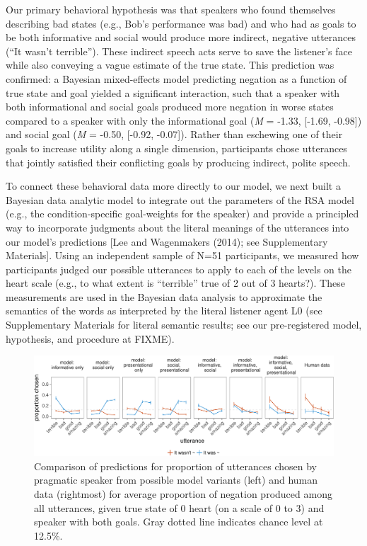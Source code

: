 \documentclass[floatsintext,man]{apa6}
\theoremstyle{definition}
\theoremstyle{definition}
\theoremstyle{definition}
\theoremstyle{remark}
\begin{document}
Our primary behavioral hypothesis was that speakers who found themselves
describing bad states (e.g., Bob's performance was bad) and who had as
goals to be both informative and social would produce more indirect,
negative utterances (\enquote{It wasn't terrible}). These indirect
speech acts serve to save the listener's face while also conveying a
vague estimate of the true state. This prediction was confirmed: a
Bayesian mixed-effects model predicting negation as a function of true
state and goal yielded a significant interaction, such that a speaker
with both informational and social goals produced more negation in worse
states compared to a speaker with only the informational goal (\emph{M}
= -1.33, {[}-1.69, -0.98{]}) and social goal (\emph{M} = -0.50,
{[}-0.92, -0.07{]}). Rather than eschewing one of their goals to
increase utility along a single dimension, participants chose utterances
that jointly satisfied their conflicting goals by producing indirect,
polite speech.

To connect these behavioral data more directly to our model, we next
built a Bayesian data analytic model to integrate out the parameters of
the RSA model (e.g., the condition-specific goal-weights for the
speaker) and provide a principled way to incorporate judgments about the
literal meanings of the utterances into our model's predictions {[}Lee
and Wagenmakers (2014); see Supplementary Materials{]}. Using an
independent sample of N=51 participants, we measured how participants
judged our possible utterances to apply to each of the levels on the
heart scale (e.g., to what extent is \enquote{terrible} true of 2 out of
3 hearts?). These measurements are used in the Bayesian data analysis to
approximate the semantics of the words as interpreted by the literal
listener agent L0 (see Supplementary Materials for literal semantic
results; see our pre-registered model, hypothesis, and procedure at
FIXME).

\begin{figure}
\centering
\includegraphics{polite_manuscript_files/figure-latex/comparison-1.pdf}
\caption{\label{fig:comparison}Comparison of predictions for proportion of
utterances chosen by pragmatic speaker from possible model variants
(left) and human data (rightmost) for average proportion of negation
produced among all utterances, given true state of 0 heart (on a scale
of 0 to 3) and speaker with both goals. Gray dotted line indicates
chance level at 12.5\%.}
\end{figure}
\end{document}
